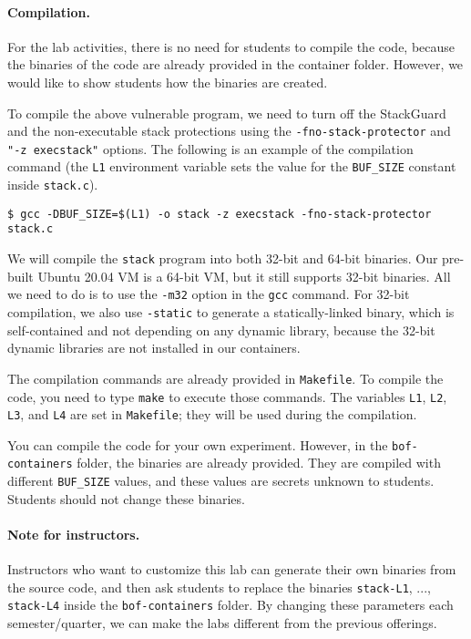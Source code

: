 \paragraph{Compilation.}
For the lab activities, there is no need for students to compile the code, 
because the binaries of the code are already provided in the container folder. 
However, we would like to
show students how the binaries are created. 

To compile the above vulnerable program, we need to 
turn off the StackGuard and the non-executable stack protections 
using the \texttt{-fno-stack-protector} and \texttt{"-z execstack"} options.
The following is an example of the compilation command (the \texttt{L1} environment 
variable sets the value for the \texttt{BUF\_SIZE} constant inside \texttt{stack.c}).   

\begin{lstlisting}
$ gcc -DBUF_SIZE=$(L1) -o stack -z execstack -fno-stack-protector stack.c
\end{lstlisting}

We will compile the \texttt{stack} program into both 32-bit and 64-bit 
binaries. Our pre-built Ubuntu 20.04 VM is a 64-bit VM, but it 
still supports 32-bit binaries. All we need to do is to 
use the \texttt{-m32} option in the \texttt{gcc} command. 
For 32-bit compilation, we also use \texttt{-static} to generate 
a statically-linked binary, which is self-contained and not depending
on any dynamic library, because the 32-bit dynamic libraries 
are not installed in our containers. 


The compilation commands are already provided in \texttt{Makefile}. To compile
the code, you need to type \texttt{make} to execute those commands.
The variables \texttt{L1}, \texttt{L2}, \texttt{L3}, and \texttt{L4} are
set in \texttt{Makefile}; they will be used during the compilation.

 
You can compile the code for your own experiment. However, in 
the \texttt{bof-containers} folder, the binaries are already provided. 
They are compiled with different \texttt{BUF\_SIZE} values, and these 
values are secrets unknown to students. Students should not change these 
binaries. 


\paragraph{Note for instructors.}
Instructors who want to customize this lab can
generate their own binaries from the source code, and then
ask students to replace the binaries \texttt{stack-L1}, ...,
\texttt{stack-L4} inside the 
\texttt{bof-containers} folder. By changing these parameters 
each semester/quarter, we can make the labs different from the 
previous offerings. 



